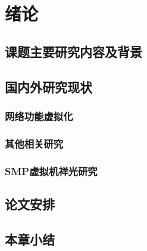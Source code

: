 \chapter{绪论}
\label{chap: Introduction}


\section{课题主要研究内容及背景}

\section{国内外研究现状}
\subsection{网络功能虚拟化}
\subsection{其他相关研究}
\subsection{SMP虚拟机祥光研究}
\section{论文安排}
\section{本章小结}
